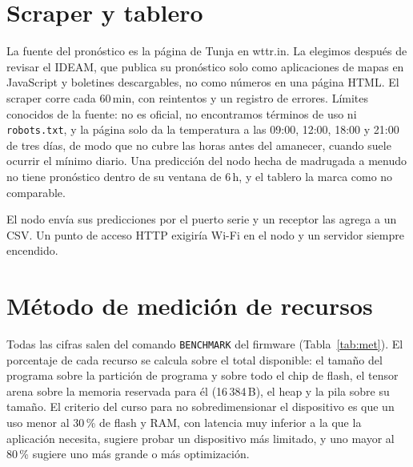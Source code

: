 \documentclass[conference]{IEEEtran}
\begin{document}
\section{Scraper y tablero}
La fuente del pron\'ostico es la p\'agina de Tunja en wttr.in. La elegimos despu\'es de revisar el IDEAM, que publica su pron\'ostico solo como aplicaciones de mapas en JavaScript y boletines descargables, no como n\'umeros en una p\'agina HTML. El scraper corre cada 60\,min, con reintentos y un registro de errores. L\'imites conocidos de la fuente: no es oficial, no encontramos t\'erminos de uso ni \texttt{robots.txt}, y la p\'agina solo da la temperatura a las 09:00, 12:00, 18:00 y 21:00 de tres d\'ias, de modo que no cubre las horas antes del amanecer, cuando suele ocurrir el m\'inimo diario. Una predicci\'on del nodo hecha de madrugada a menudo no tiene pron\'ostico dentro de su ventana de 6\,h, y el tablero la marca como no comparable.

El nodo env\'ia sus predicciones por el puerto serie y un receptor las agrega a un CSV. Un punto de acceso HTTP exigir\'ia Wi-Fi en el nodo y un servidor siempre encendido.

\section{M\'etodo de medici\'on de recursos}
Todas las cifras salen del comando \texttt{BENCHMARK} del firmware (Tabla~\ref{tab:met}). El porcentaje de cada recurso se calcula sobre el total disponible: el tama\~no del programa sobre la partici\'on de programa y sobre todo el chip de flash, el tensor arena sobre la memoria reservada para \'el (16\,384\,B), el heap y la pila sobre su tama\~no. El criterio del curso para no sobredimensionar el dispositivo es que un uso menor al 30\,\% de flash y RAM, con latencia muy inferior a la que la aplicaci\'on necesita, sugiere probar un dispositivo m\'as limitado, y uno mayor al 80\,\% sugiere uno m\'as grande o m\'as optimizaci\'on.
\end{document}
